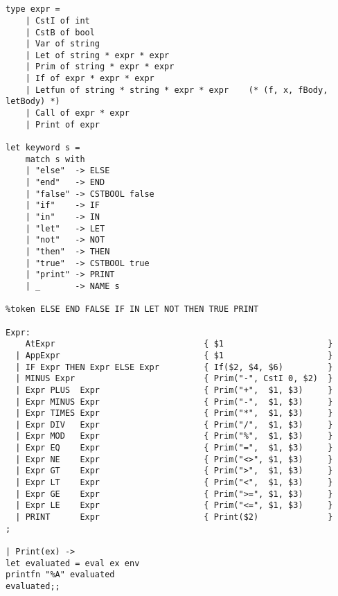 \documentclass[11pt,a4paper]{article}
\begin{document}
\section{}
\begin{verbatim}
type expr = 
    | CstI of int
    | CstB of bool
    | Var of string
    | Let of string * expr * expr
    | Prim of string * expr * expr
    | If of expr * expr * expr
    | Letfun of string * string * expr * expr    (* (f, x, fBody, letBody) *)
    | Call of expr * expr
    | Print of expr

let keyword s =
    match s with
    | "else"  -> ELSE 
    | "end"   -> END
    | "false" -> CSTBOOL false
    | "if"    -> IF
    | "in"    -> IN
    | "let"   -> LET
    | "not"   -> NOT
    | "then"  -> THEN
    | "true"  -> CSTBOOL true
    | "print" -> PRINT
    | _       -> NAME s

%token ELSE END FALSE IF IN LET NOT THEN TRUE PRINT

Expr:
    AtExpr                              { $1                     }
  | AppExpr                             { $1                     }
  | IF Expr THEN Expr ELSE Expr         { If($2, $4, $6)         }
  | MINUS Expr                          { Prim("-", CstI 0, $2)  }
  | Expr PLUS  Expr                     { Prim("+",  $1, $3)     }
  | Expr MINUS Expr                     { Prim("-",  $1, $3)     }
  | Expr TIMES Expr                     { Prim("*",  $1, $3)     }
  | Expr DIV   Expr                     { Prim("/",  $1, $3)     } 
  | Expr MOD   Expr                     { Prim("%",  $1, $3)     }
  | Expr EQ    Expr                     { Prim("=",  $1, $3)     }
  | Expr NE    Expr                     { Prim("<>", $1, $3)     }
  | Expr GT    Expr                     { Prim(">",  $1, $3)     }
  | Expr LT    Expr                     { Prim("<",  $1, $3)     }
  | Expr GE    Expr                     { Prim(">=", $1, $3)     }
  | Expr LE    Expr                     { Prim("<=", $1, $3)     }
  | PRINT      Expr                     { Print($2)              }
;

| Print(ex) -> 
let evaluated = eval ex env
printfn "%A" evaluated
evaluated;;
\end{verbatim}
\section{}
\end{document}
